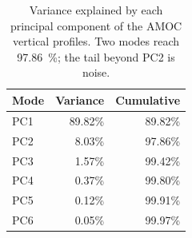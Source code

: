 \begin{table}[!ht]
    \centering
    \small
    \caption[Variance explained by the vertical PCA modes.]{Variance explained
    by each principal component of the AMOC vertical profiles. Two modes reach
    \SI{97.86}{\percent}; the tail beyond PC2 is noise.}
    \label{tab:pca-variance}
    \begin{tabular}{@{}lrr@{}}
        \toprule
        \textbf{Mode} & \textbf{Variance} & \textbf{Cumulative} \\
        \midrule
        PC1 & 89.82\% & 89.82\% \\
        PC2 &  8.03\% & 97.86\% \\
        PC3 &  1.57\% & 99.42\% \\
        PC4 &  0.37\% & 99.80\% \\
        PC5 &  0.12\% & 99.91\% \\
        PC6 &  0.05\% & 99.97\% \\
        \bottomrule
    \end{tabular}
\end{table}

